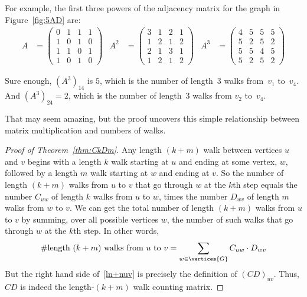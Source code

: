 For example, the first three powers of the adjacency matrix for the
graph in Figure~\ref{fig:5AD} are:
\begin{align*}
    A &= \begin{pmatrix}
            0 & 1 & 1 & 1 \\
            1 & 0 & 1 & 0 \\
            1 & 1 & 0 & 1 \\
            1 & 0 & 1 & 0
         \end{pmatrix} & %
  A^2 &= \begin{pmatrix}
            3 & 1 & 2 & 1 \\
            1 & 2 & 1 & 2 \\
            2 & 1 & 3 & 1 \\
            1 & 2 & 1 & 2
         \end{pmatrix} & %
  A^3 &= \begin{pmatrix}
            4 & 5 & 5 & 5 \\
            5 & 2 & 5 & 2 \\
            5 & 5 & 4 & 5 \\
            5 & 2 & 5 & 2
         \end{pmatrix}
\end{align*}

Sure enough, $(A^3)_{14}$ is $5$, which is the number of length~3 walks
from~$v_1$ to~$v_4$.  And $(A^3)_{24} = 2$, which is the number of
length~3 walks from $v_2$ to~$v_4$.  
\fi

That may seem amazing, but the proof uncovers this simple relationship
between matrix multiplication and numbers of walks.

\begin{editingnotes}
\end{editingnotes}

\begin{proof}[Proof of Theorem~\ref{thm:CkDm}]
  Any length $(k+m)$ walk between vertices $u$ and $v$ begins with a
  length $k$ walk starting at $u$ and ending at some vertex, $w$,
  followed by a length $m$ walk starting at $w$ and ending at $v$.  So
  the number of length $(k+m)$ walks from $u$ to $v$ that go through
  $w$ at the $k$th step equals the number $C_{uw}$ of length $k$ walks
  from $u$ to $w$, times the number $D_{wv}$ of length $m$ walks from
  $w$ to $v$.  We can get the total number of length $(k+m)$ walks
  from $u$ to $v$ by summing, over all possible vertices $w$, the
  number of such walks that go through $w$ at the $k$th step.  In
  other words,
\begin{equation}\label{ln+nuv}
\text{\#length $(k+m)$ walks from $u$ to $v$} =
              \sum_{w \in \vertices{G}} C_{uw}\cdot D_{wv}
\end{equation}
But the right hand side of~\eqref{ln+nuv} is precisely the definition of
$(CD)_{uv}$.  Thus, $CD$ is indeed the length-$(k+m)$ walk counting matrix.
\end{proof}


